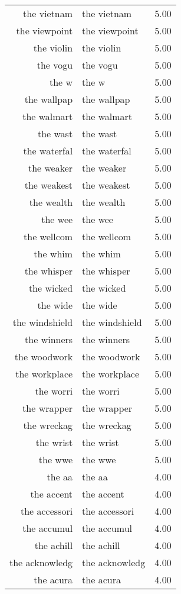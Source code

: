 \begin{table}[ht]
\begin{tabular}{rlr}
  the vietnam & the vietnam & 5.00 \\ 
  the viewpoint & the viewpoint & 5.00 \\ 
  the violin & the violin & 5.00 \\ 
  the vogu & the vogu & 5.00 \\ 
  the w & the w & 5.00 \\ 
  the wallpap & the wallpap & 5.00 \\ 
  the walmart & the walmart & 5.00 \\ 
  the wast & the wast & 5.00 \\ 
  the waterfal & the waterfal & 5.00 \\ 
  the weaker & the weaker & 5.00 \\ 
  the weakest & the weakest & 5.00 \\ 
  the wealth & the wealth & 5.00 \\ 
  the wee & the wee & 5.00 \\ 
  the wellcom & the wellcom & 5.00 \\ 
  the whim & the whim & 5.00 \\ 
  the whisper & the whisper & 5.00 \\ 
  the wicked & the wicked & 5.00 \\ 
  the wide & the wide & 5.00 \\ 
  the windshield & the windshield & 5.00 \\ 
  the winners & the winners & 5.00 \\ 
  the woodwork & the woodwork & 5.00 \\ 
  the workplace & the workplace & 5.00 \\ 
  the worri & the worri & 5.00 \\ 
  the wrapper & the wrapper & 5.00 \\ 
  the wreckag & the wreckag & 5.00 \\ 
  the wrist & the wrist & 5.00 \\ 
  the wwe & the wwe & 5.00 \\ 
  the aa & the aa & 4.00 \\ 
  the accent & the accent & 4.00 \\ 
  the accessori & the accessori & 4.00 \\ 
  the accumul & the accumul & 4.00 \\ 
  the achill & the achill & 4.00 \\ 
  the acknowledg & the acknowledg & 4.00 \\ 
  the acura & the acura & 4.00 \\ 

\end{tabular}
\end{table}
